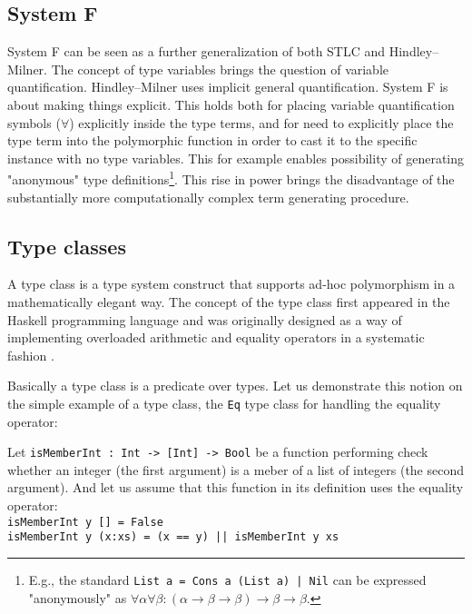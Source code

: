 \documentclass[11pt]{article}
\newcommand{\ar}{\rightarrow\xspace}
\newcommand{\HM}{Hindley–Milner\xspace}
\newcommand{\red}[1]{{\color{red} #1}}
\begin{document}
\begin{article}

\subsection{System F}

System F \red{\citep{TODO}} can be seen as a further generalization of both STLC and \HM. 
The concept of type variables brings the question of variable quantification. 
\HM uses implicit general quantification. System F is about making things explicit.
This holds both for placing variable quantification symbols ($\forall$) explicitly inside the type terms, and for need to explicitly place the type term into the polymorphic function in order to cast it to the specific instance with no type variables. This for example enables possibility of generating "anonymous" type definitions\footnote{E.g., the standard \texttt{List a = Cons a (List a) | Nil} can be expressed "anonymously" as $\forall \alpha \forall \beta : (\alpha \ar \beta \ar \beta) \ar \beta \ar \beta  $.}. This rise in power brings the disadvantage of the substantially more computationally complex term generating procedure. 

\subsection{Type classes}

A type class is a type system construct that supports ad-hoc polymorphism in a mathematically elegant way. The concept of the type class first appeared in the Haskell programming language \citep{morris2013type} and was originally designed as a way of implementing overloaded arithmetic and equality operators in a systematic fashion \citep{wadler1989make}.

Basically a type class is a predicate over types. Let us demonstrate this notion on the simple example of a type class, the \texttt{Eq} type class for handling the equality operator: 

Let \texttt{isMemberInt : Int -> [Int] -> Bool} be a function performing check whether an integer (the first argument) is a meber of a list of integers (the second argument). And let us assume that this function in its definition uses the equality operator:
\texttt{~\\
isMemberInt y [] = False\\
isMemberInt y (x:xs) = (x == y) || isMemberInt y xs} 


\end{article}
\end{document}
